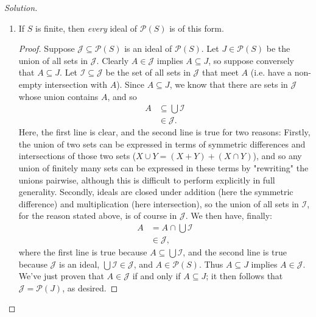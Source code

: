 \documentclass[12pt]{article}
\newenvironment{solution}
  {\renewcommand\qedsymbol{$\blacksquare$}\begin{proof}[Solution]}
{\end{proof}}
\newenvironment{sproof}{
  \renewcommand\qedsymbol{$\square$}
  \begin{proof}
  }{
  \end{proof}
}
\theoremstyle{remark}
\begin{document}
\begin{solution}
\begin{enumerate}
    \item If $S$ is finite, then \textit{every} ideal of $\mathscr{P}(S)$ is of this form.
      \begin{sproof}
        \indent Suppose $\mathcal{J}\subseteq\mathscr{P}(S)$ 
        is an ideal of $\mathscr{P}(S)$.
        Let $J\in\mathscr{P}(S)$ be the union of all sets in $\mathcal{J}$.
        Clearly $A\in \mathcal{J}$ implies $A\subseteq J$, so suppose conversely that $A\subseteq J$.
        Let $\mathcal{I}\subseteq\mathcal{J}$ be the set of all sets in $\mathcal{J}$ that meet $A$
        (i.e. have a non-empty intersection with $A$).
        Since $A\subseteq J$, we know that there are sets in $\mathcal{J}$ whose union contains $A$, and so
        \begin{align*}
          A &\subseteq \bigcup\mathcal{I} \\
          &\in \mathcal{J}.
        \end{align*}
        \indent Here, the first line is clear, and the second line is true for two reasons: 
        Firstly, the union of two sets can be expressed in terms of symmetric 
        differences and intersections of those two sets ($X\cup Y=(X+Y)+(X\cap Y)$), 
        and so any union of finitely many sets can be expressed in these terms by "rewriting" the unions
        pairwise, although this is difficult to perform explicitly in full generality.
        Secondly, ideals are closed under addition (here the symmetric difference) and multiplication 
        (here intersection), so the union of all sets in $\mathcal{I}$, for the reason stated above,
        is of course in $\mathcal{J}$.
        We then have, finally:
        \begin{align*}
          A &= A\cap\bigcup\mathcal{I}\\
          &\in\mathcal{J},
        \end{align*}
        where the first line is true because $A\subseteq\bigcup\mathcal{I}$, and the second line
        is true because $\mathcal{J}$ is an ideal, $\bigcup\mathcal{I}\in\mathcal{J}$, and 
        $A\in\mathscr{P}(S)$.
        Thus $A\subseteq J$ implies $A\in\mathcal{J}$.\\
        \indent We've just proven that $A\in\mathcal{J}$ if and only if $A\subseteq J$; it then follows
        that $\mathcal{J} = \mathscr{P}(J)$, as desired.
      \end{sproof}


\end{enumerate}
\end{solution}
\end{document}
